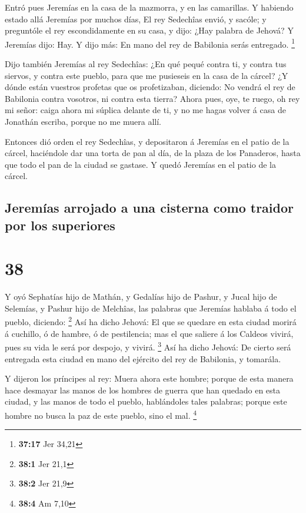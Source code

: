  Entró pues Jeremías en la casa de la mazmorra, y en las
camarillas. Y habiendo estado allá Jeremías por muchos días,
 El rey Sedechîas envió, y sacóle; y preguntóle el rey
escondidamente en su casa, y dijo: ¿Hay palabra de Jehová? Y Jeremías
dijo: Hay. Y dijo más: En mano del rey de Babilonia serás entregado.
\footnote{\textbf{37:17} Jer 34,21}

 Dijo también Jeremías al rey Sedechîas: ¿En qué pequé
contra ti, y contra tus siervos, y contra este pueblo, para que me
pusieseis en la casa de la cárcel?  ¿Y dónde están
vuestros profetas que os profetizaban, diciendo: No vendrá el rey de
Babilonia contra vosotros, ni contra esta tierra?  Ahora
pues, oye, te ruego, oh rey mi señor: caiga ahora mi súplica delante de
ti, y no me hagas volver á casa de Jonathán escriba, porque no me muera
allí.

 Entonces dió orden el rey Sedechîas, y depositaron á
Jeremías en el patio de la cárcel, haciéndole dar una torta de pan al
día, de la plaza de los Panaderos, hasta que todo el pan de la ciudad se
gastase. Y quedó Jeremías en el patio de la cárcel.

\hypertarget{jeremuxedas-arrojado-a-una-cisterna-como-traidor-por-los-superiores}{%
\subsection{Jeremías arrojado a una cisterna como traidor por los
superiores}\label{jeremuxedas-arrojado-a-una-cisterna-como-traidor-por-los-superiores}}

\hypertarget{section-37}{%
\section{38}\label{section-37}}

 Y oyó Sephatías hijo de Mathán, y Gedalías hijo de
Pashur, y Jucal hijo de Selemías, y Pashur hijo de Melchîas, las
palabras que Jeremías hablaba á todo el pueblo, diciendo: \footnote{\textbf{38:1}
  Jer 21,1}  Así ha dicho Jehová: El que se quedare en
esta ciudad morirá á cuchillo, ó de hambre, ó de pestilencia; mas el que
saliere á los Caldeos vivirá, pues su vida le será por despojo, y
vivirá. \footnote{\textbf{38:2} Jer 21,9}  Así ha dicho
Jehová: De cierto será entregada esta ciudad en mano del ejército del
rey de Babilonia, y tomarála.

 Y dijeron los príncipes al rey: Muera ahora este hombre;
porque de esta manera hace desmayar las manos de los hombres de guerra
que han quedado en esta ciudad, y las manos de todo el pueblo,
hablándoles tales palabras; porque este hombre no busca la paz de este
pueblo, sino el mal. \footnote{\textbf{38:4} Am 7,10}

